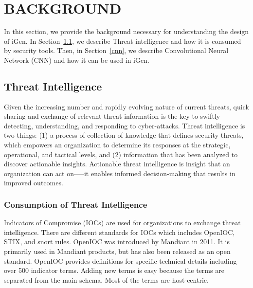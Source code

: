 \chapter{BACKGROUND} \label{chap:background}
In this section, we provide the background necessary for understanding the design of iGen. In Section~\ref{ti}, we describe Threat intelligence and how it is consumed by security tools. Then, in Section~\ref{cnn}, we describe Convolutional Neural Network (CNN) and how it can be used in iGen.  

\section{Threat Intelligence} \label{ti}

Given the increasing number and rapidly evolving nature of current threats, quick sharing and exchange of relevant threat information is the key to swiftly detecting, understanding, and responding to cyber-attacks. Threat intelligence is two things: (1) a process of collection of knowledge that defines security threats, which empowers an organization to determine its responses at the strategic, operational, and tactical levels, and (2) information that has been analyzed to discover actionable insights. Actionable threat intelligence is insight that an organization can act on—--it enables informed decision-making that results in improved outcomes. 



\subsection{Consumption of Threat Intelligence}

Indicators of Compromise (IOCs) are used for organizations to exchange threat intelligence. There are different standards for IOCs which includes OpenIOC, STIX, and snort rules. OpenIOC was introduced by Mandiant in 2011.  It is primarily used in Mandiant products, but has also been released as an open standard. OpenIOC provides definitions for specific technical details including over 500 indicator terms. Adding new terms is easy because the terms are separated from the main schema. Most of the terms are host-centric.

